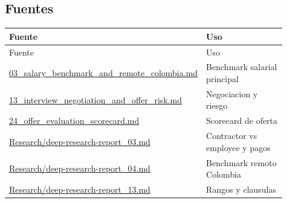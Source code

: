 \subsection{Fuentes}


\begin{center}
\scriptsize
\begin{longtable}{>{\raggedright\arraybackslash}p{0.455\linewidth} >{\raggedright\arraybackslash}p{0.455\linewidth}}
\toprule
Fuente & Uso \\
\midrule
\endfirsthead
\toprule
Fuente & Uso \\
\midrule
\endhead
\href{file:///E:/Laboral/03_salary_benchmark_and_remote_colombia.md}{03\_salary\_benchmark\_and\_remote\_colombia.md} & Benchmark salarial principal \\
\href{file:///E:/Laboral/13_interview_negotiation_and_offer_risk.md}{13\_interview\_negotiation\_and\_offer\_risk.md} & Negociacion y riesgo \\
\href{file:///E:/Laboral/24_offer_evaluation_scorecard.md}{24\_offer\_evaluation\_scorecard.md} & Scorecard de oferta \\
\href{file:///E:/Laboral/Research/deep-research-report_03.md}{Research/deep-research-report\_03.md} & Contractor vs employee y pagos \\
\href{file:///E:/Laboral/Research/deep-research-report_04.md}{Research/deep-research-report\_04.md} & Benchmark remoto Colombia \\
\href{file:///E:/Laboral/Research/deep-research-report_13.md}{Research/deep-research-report\_13.md} & Rangos y clausulas \\
\bottomrule
\end{longtable}
\end{center}
